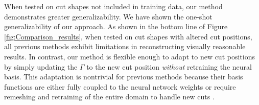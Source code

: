 When tested on cut shapes not included in training data, our method demonstrates greater generalizability. We have shown the one-shot generalizability of our approach. As shown in the bottom line of Figure \ref{fig:Comparison_results}, when tested on cut shapes with altered cut positions, all previous methods exhibit limitations in reconstructing visually reasonable results. In contrast, our method is flexible enough to adapt to new cut positions by simply updating the $\Gamma$ to the new cut position \emph{without} retraining the neural basis. This adaptation is nontrivial for previous methods because their basis functions are either fully coupled to the neural network weights \cite{chang:2023:licrom} or require remeshing and retraining of the entire domain to handle new cuts \cite{Belhe:2023:DiscontinuityAwareNeuralFields}.




 


